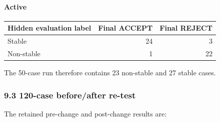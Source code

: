 \documentclass[
]{article}
\begin{document}
\paragraph{Active}\label{active}

\begin{longtable}[]{@{}lrr@{}}
\toprule\noalign{}
Hidden evaluation label & Final ACCEPT & Final REJECT \\
\midrule\noalign{}
\endhead
\bottomrule\noalign{}
\endlastfoot
Stable & 24 & 3 \\
Non-stable & 1 & 22 \\
\end{longtable}

The 50-case run therefore contains 23 non-stable and 27 stable cases.

\subsubsection{9.3 120-case before/after
re-test}\label{case-beforeafter-re-test}

The retained pre-change and post-change results are:
\end{document}
